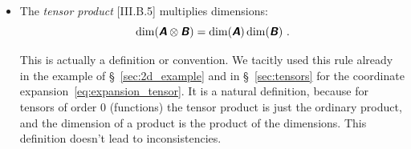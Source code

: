 \documentclass[\ifafour a4paper,12pt,\else a5paper,10pt,\fi%
onecolumn,oneside,article,%
british%
]{memoir}
\makeatletter
\theoremstyle{remark}
\theoremstyle{innote}
\newcommand*{\mathte}[1]{\textbf{\textit{\textsf{#1}}}}
\newcommand*{\de}{\partialup}%
\newcommand*{\di}{\mathrm{d}}%
\renewcommand*{\|}[1][]{\nonscript\,#1\vert\nonscript\;\mathopen{}}
\newcommand*{\sect}{\S}%
\newcommand*{\q}{}%
\DeclareRobustCommand*{\q}{%
  \mathord{\mathpalette\bigcdot@{}}%
}
\newcommand*{\bigcdot@scalefactor}{0.7}
\newcommand*{\bigcdot@widthfactor}{1.5}
\newcommand*{\bigcdot@}[2]{%
  \sbox0{$#1\vcenter{}$}%
  \sbox2{$#1\cdot\m@th$}%
  \hbox to \bigcdot@widthfactor\wd2{%
    \hfil
    \raise\ht0\hbox{%
      \scalebox{\bigcdot@scalefactor}{%
        \lower\ht0\hbox{$#1\bullet\m@th$}%
      }%
    }%
    \hfil
  }%
}
\newcommand*{\Xx}{\textsf{X}}
\newcommand*{\Aa}{\textsf{A}}
\newcommand*{\Bb}{\textsf{B}}
\newcommand*{\yA}{\mathte{A}}
\newcommand*{\yB}{\mathte{B}}
\renewcommand*{\i}{\indices}
\newcommand*{\dex}[1][i]{\frac{\de}{\de x^{#1}}}
\newcommand*{\dix}[1][i]{\di x^{#1}}
\makeatother
\begin{document}
\begin{itemize}[wide=0pt]
\item The \emph{tensor product} [III.B.5] multiplies dimensions:
  \begin{equation}
  \dim(\yA\otimes\yB) = \dim(\yA)\dim(\yB)\ .\label{eq:tensor_mult}
\end{equation}

This is actually a definition or convention. We tacitly used this rule
already in the example of \sect~\ref{sec:2d_example} and in
\sect~\ref{sec:tensors} for the coordinate
expansion~\eqref{eq:expansion_tensor}. It is a natural definition, because
for tensors of order 0 (functions) the tensor product is just the ordinary
product, and the dimension of a product is the product of the dimensions.
This definition doesn't lead to inconsistencies.







\end{itemize}
\end{document}
